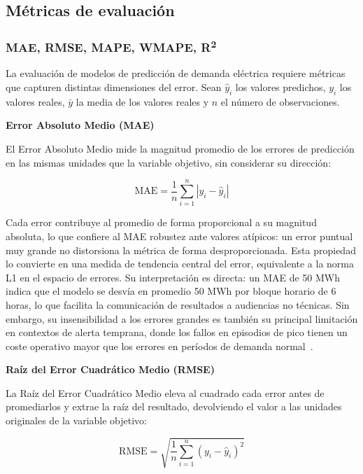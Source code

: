 \documentclass[12pt, a4paper]{article}
\begin{document}
\subsection{Métricas de evaluación}

\subsubsection{MAE, RMSE, MAPE, WMAPE, R\textsuperscript{2}}

La evaluación de modelos de predicción de demanda eléctrica requiere métricas que capturen distintas dimensiones del error. Sean $\hat{y}_i$ los valores predichos, $y_i$ los valores reales, $\bar{y}$ la media de los valores reales y $n$ el número de observaciones.

\textbf{Error Absoluto Medio (MAE)}

El Error Absoluto Medio mide la magnitud promedio de los errores de predicción en las mismas unidades que la variable objetivo, sin considerar su dirección:

\begin{equation}
\text{MAE} = \frac{1}{n} \sum_{i=1}^{n} |y_i - \hat{y}_i|
\end{equation}

Cada error contribuye al promedio de forma proporcional a su magnitud absoluta, lo que confiere al MAE robustez ante valores atípicos: un error puntual muy grande no distorsiona la métrica de forma desproporcionada. Esta propiedad lo convierte en una medida de tendencia central del error, equivalente a la norma L1 en el espacio de errores. Su interpretación es directa: un MAE de 50 MWh indica que el modelo se desvía en promedio 50 MWh por bloque horario de 6 horas, lo que facilita la comunicación de resultados a audiencias no técnicas. Sin embargo, su insensibilidad a los errores grandes es también su principal limitación en contextos de alerta temprana, donde los fallos en episodios de pico tienen un coste operativo mayor que los errores en períodos de demanda normal~\cite{gassar2024, rubattu2023}.

\textbf{Raíz del Error Cuadrático Medio (RMSE)}

La Raíz del Error Cuadrático Medio eleva al cuadrado cada error antes de promediarlos y extrae la raíz del resultado, devolviendo el valor a las unidades originales de la variable objetivo:

\begin{equation}
\text{RMSE} = \sqrt{\frac{1}{n} \sum_{i=1}^{n} (y_i - \hat{y}_i)^2}
\end{equation}
\end{document}
